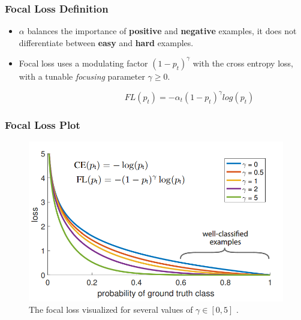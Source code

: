 \documentclass[10pt,fleqn,unknownkeysallowed]{beamer}
\begin{document}
\begin{frame}
	\frametitle{Focal Loss Definition}
	\linespread{1.5}
	\begin{itemize}
		\item{$\alpha$ balances the importance of \textbf{positive} and \textbf{negative} examples, it does not differentiate between \textbf{easy} and \textbf{hard} examples.}
		\item{Focal loss uses a modulating factor $(1 - p_t)^\gamma$ with the cross entropy loss, with a tunable \textit{focusing} parameter $\gamma \ge 0$.}
	\end{itemize}
	\begin{center}
		\begin{equation*}
		\quad  \quad \quad \quad  \quad \quad \quad \quad FL(p_t) = - \alpha_t (1 - p_t)^\gamma log(p_t)
		\end{equation*}
	\end{center}

\end{frame}

\begin{frame}
	\frametitle{Focal Loss Plot}
	\begin{figure}
		\begin{center}
			\includegraphics[width=0.8\columnwidth]{images/focal_loss.png}
		\end{center}
		\caption{The focal loss visualized for several values of $\gamma \in [0, 5]$ \cite{focallossRoss}.}
	\end{figure}
\end{frame}


\end{document}
